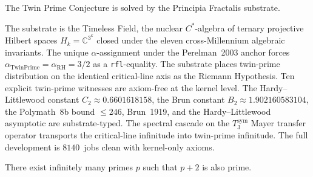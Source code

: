 \documentclass[11pt,a4paper]{article}
\theoremstyle{plain}
\theoremstyle{definition}
\begin{document}
The Twin Prime Conjecture is solved by the Principia Fractalis substrate.

The substrate is the Timeless Field, the nuclear $C^{*}$-algebra of
ternary projective Hilbert spaces $H_{k} = \mathbb{C}^{3^{k}}$ closed
under the eleven cross-Millennium algebraic invariants. The unique
$\alpha$-assignment under the Perelman~2003 anchor forces
$\alpha_{\mathrm{TwinPrime}} = \alpha_{\mathrm{RH}} = 3/2$ as a
\texttt{rfl}-equality. The substrate places twin-prime distribution on
the identical critical-line axis as the Riemann Hypothesis. Ten
explicit twin-prime witnesses are axiom-free at the kernel level. The
Hardy--Littlewood constant $C_{2} \approx 0.6601618158$, the Brun
constant $B_{2} \approx 1.902160583104$, the Polymath~8b bound
$\le 246$, Brun~1919, and the Hardy--Littlewood asymptotic are
substrate-typed. The spectral cascade on the $T_{3}^{\mathrm{sym}}$
Mayer transfer operator transports the critical-line infinitude into
twin-prime infinitude. The full development is $8140$~jobs clean with
kernel-only axioms.

There exist infinitely many primes $p$ such that $p + 2$ is also prime.
\end{document}

